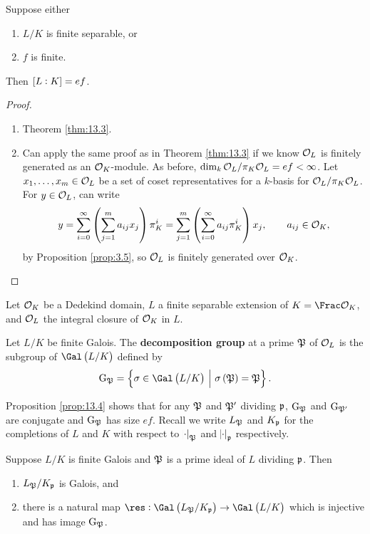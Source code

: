\begin{corollary}
\label{cor:13.6}
Suppose either
\begin{enumerate}
\item $ L / K $ is finite separable, or
\item $ f $ is finite.
\end{enumerate}
Then $ \sbr{L : K} = ef $.
\end{corollary}

\begin{proof}
\hfill
\begin{enumerate}
\item Theorem \ref{thm:13.3}.
\item Can apply the same proof as in Theorem \ref{thm:13.3} if we know $ \mathcal{O}_L $ is finitely generated as an $ \mathcal{O}_K $-module. As before, $ \dim_k \mathcal{O}_L / \pi_K\mathcal{O}_L = ef < \infty $. Let $ x_1, \dots, x_m \in \mathcal{O}_L $ be a set of coset representatives for a $ k $-basis for $ \mathcal{O}_L / \pi_K\mathcal{O}_L $. For $ y \in \mathcal{O}_L $, can write
$$ y = \sum_{i = 0}^\infty \br{\sum_{j = 1}^m a_{ij}x_j}\pi_K^i = \sum_{j = 1}^m \br{\sum_{i = 0}^\infty a_{ij}\pi_K^i}x_j, \qquad a_{ij} \in \OOO_K, $$
by Proposition \ref{prop:3.5}, so $ \mathcal{O}_L $ is finitely generated over $ \mathcal{O}_K $.
\end{enumerate}
\end{proof}

Let $ \mathcal{O}_K $ be a Dedekind domain, $ L $ a finite separable extension of $ K = \Frac \OOO_K $, and $ \mathcal{O}_L $ the integral closure of $ \mathcal{O}_K $ in $ L $.

\begin{definition}
Let $ L / K $ be finite Galois. The \textbf{decomposition group} at a prime $ \mathfrak{P} $ of $ \mathcal{O}_L $ is the subgroup of $ \Gal\br{L / K} $ defined by
$$ \G_\pp = \cbr{\sigma \in \Gal\br{L / K} \st \sigma\br{\pp} = \pp}. $$
\end{definition}

Proposition \ref{prop:13.4} shows that for any $ \mathfrak{P} $ and $ \mathfrak{P}' $ dividing $ \mathfrak{p} $, $ \mathrm{G}_{\mathfrak{P}} $ and $ \mathrm{G}_{\mathfrak{P}'} $ are conjugate and $ \mathrm{G}_{\mathfrak{P}} $ has size $ ef $. Recall we write $ L_{\mathfrak{P}} $ and $ K_{\mathfrak{p}} $ for the completions of $ L $ and $ K $ with respect to $ \abs{\cdot}_{\mathfrak{P}} $ and $ \abs{\cdot}_{\mathfrak{p}} $ respectively.

\begin{proposition}
Suppose $ L / K $ is finite Galois and $ \mathfrak{P} $ is a prime ideal of $ L $ dividing $ \mathfrak{p} $. Then
\begin{enumerate}
\item $ L_{\mathfrak{P}} / K_{\mathfrak{p}} $ is Galois, and
\item there is a natural map $ \res : \Gal\br{L_\pp / K_\ppp} \to \Gal\br{L / K} $ which is injective and has image $ \mathrm{G}_{\mathfrak{P}} $.
\end{enumerate}
\end{proposition}

